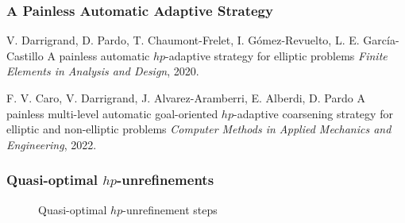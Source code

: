 \begin{frame}
    \frametitle{A Painless Automatic Adaptive Strategy}
    
    \begin{figure}
        \centering
        
    \end{figure}

    \begin{thebibliography}{10}
        \beamertemplatearticlebibitems
        \scriptsize
        V. Darrigrand, D. Pardo, T. Chaumont-Frelet, I. G{\'o}mez-Revuelto, L. E. Garc{\'i}a-Castillo
        \newblock A painless automatic $hp$-adaptive strategy for elliptic problems
        \newblock \emph{Finite Elements in Analysis and Design}, 2020.

        \beamertemplatearticlebibitems
        \scriptsize
        F. V. Caro, V. Darrigrand, J. Alvarez-Aramberri, E. Alberdi, D. Pardo
        \newblock A painless multi-level automatic goal-oriented $hp$-adaptive coarsening strategy for elliptic and non-elliptic problems
        \newblock \emph{Computer Methods in Applied Mechanics and Engineering}, 2022.
    \end{thebibliography}
\end{frame}

\begin{frame}
    \frametitle{Quasi-optimal \( hp \)-unrefinements}
    \vfill
    \begin{center}
        \begin{figure}
            \centering
        		
            \caption{Quasi-optimal \( hp \)-unrefinement steps}
        \end{figure}
    \end{center}    
\end{frame}